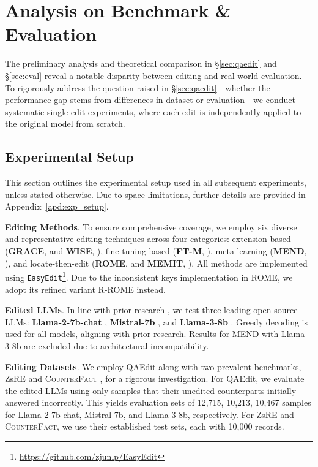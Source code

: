
\section{Analysis on Benchmark \& Evaluation}
\label{sec:single_edit}

The preliminary analysis and theoretical comparison in \S\ref{sec:qaedit} and \S\ref{sec:eval} reveal a notable disparity between editing and real-world evaluation.
To rigorously address the question raised in \S\ref{sec:qaedit}---whether the performance gap stems from differences in dataset or evaluation---we conduct systematic single-edit experiments, where each edit is independently applied to the original model from scratch.

\subsection{Experimental Setup}
\label{sec:single_setup}

This section outlines the experimental setup used in all subsequent experiments, unless stated otherwise. 
Due to space limitations, further details are provided in Appendix~\ref{apd:exp_setup}.

\noindent\textbf{Editing Methods}. 
To ensure comprehensive coverage, we employ six diverse and representative editing techniques across four categories: extension based (\textbf{GRACE}, \citealp{hartvigsen2023aging} and \textbf{WISE}, \citealp{wang2024wise}), fine-tuning based (\textbf{FT-M}, \citealp{zhang2024comprehensivestudyknowledgeediting}), meta-learning (\textbf{MEND}, \citealp{mitchell2022fast}), and locate-then-edit (\textbf{ROME}, \citealp{meng2023locating} and \textbf{MEMIT}, \citealp{meng2023massediting}).
All methods are implemented using \texttt{EasyEdit}\footnote{\url{https://github.com/zjunlp/EasyEdit}}. 
Due to the inconsistent keys implementation in ROME, we adopt its refined variant R-ROME \cite{gupta-etal-2024-rebuilding, yang-etal-2024-fall} instead.

\noindent\textbf{Edited LLMs}.  
In line with prior research \cite{wang2024wise, fang2024alphaedit}, we test three leading open-source LLMs:
\textbf{Llama-2-7b-chat} \cite{touvron2023llama2openfoundation}, 
\textbf{Mistral-7b} \cite{jiang2023mistral7b}, and \textbf{Llama-3-8b} \cite{llama3}.
Greedy decoding is used for all models, aligning with prior research.
Results for MEND with Llama-3-8b are excluded due to architectural incompatibility.

\noindent\textbf{Editing Datasets}.
We employ QAEdit along with two prevalent benchmarks, ZsRE \cite{levy2017zero} and \textsc{CounterFact} \cite{meng2023locating}, for a rigorous investigation.
For QAEdit, we evaluate the edited LLMs using only samples that their unedited counterparts initially answered incorrectly.
This yields evaluation sets of 12,715, 10,213, 10,467 samples for Llama-2-7b-chat, Mistral-7b, and Llama-3-8b, respectively.
For ZsRE and \textsc{CounterFact}, we use their established test sets, each with 10,000 records.


